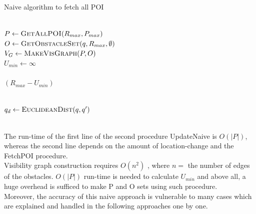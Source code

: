 \documentclass{sig-alternate}
\begin{document}
\begin{algorithm}
\caption{Naive algorithm to fetch all POI}
\label{Naive1}
\begin{algorithmic}[1]

	
	\\ $P \gets \textsc{GetAllPOI}(R_{max}, P_{max})$
	\\ $O \gets \textsc{GetObstacleSet}(q, R_{max}, \emptyset)$
	\\ $V_G \gets \textsc{MakeVisGraph}(P, O)$
	\\ $U_{min} \gets \infty$
	\\
	\\ \Return $(R_{max} - U_{min})$
\EndProcedure
\\

    
    \\ $q_d \gets \textsc{EuclideanDist}(q, q')$
	\\ 
	\\ 
\EndProcedure
\end{algorithmic}
\end{algorithm}

The run-time of the first line of the second procedure UpdateNaive is $O(\left\vert{P}\right\vert)$, whereas the second line depends on the amount of location-change and the FetchPOI procedure.
\\Visibility graph construction requires $O(n^2)$ \cite{mur}, where $n =$ the number of edges of the obstacles. $O(\left\vert{P}\right\vert)$ run-time is needed to calculate $U_{min}$ and above all, a huge overhead is sufficed to make P and O sets using such procedure.
\\Moreover, the accuracy of this naive approach is vulnerable to many cases which are explained and handled in the following approaches one by one.
\end{document}
